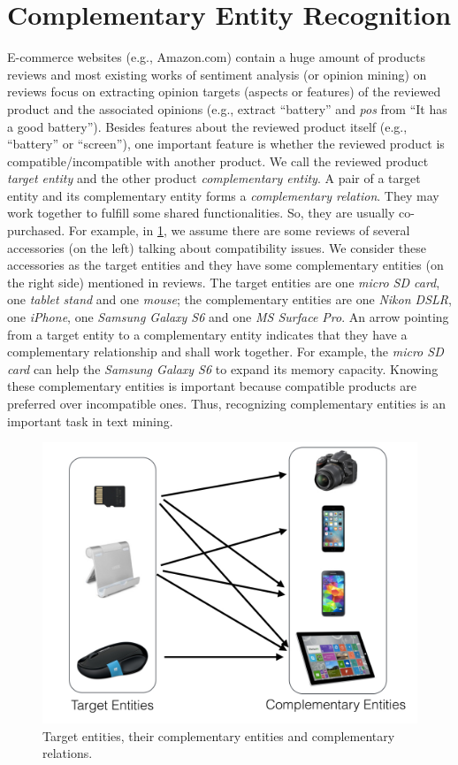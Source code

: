 
\section{Complementary Entity Recognition}

E-commerce websites (e.g., Amazon.com) contain a huge amount of products reviews and most existing works of sentiment analysis \cite{pang2002thumbs} (or opinion mining) on reviews focus on extracting opinion targets (aspects or features) of the reviewed product and the associated opinions \cite{hu2004mining,popescu2007extracting,liu2015sentiment} (e.g., extract ``battery'' and \textit{pos} from ``It has a good battery''). Besides features about the reviewed product itself (e.g., ``battery'' or ``screen''), one important feature is whether the reviewed product is compatible/incompatible with another product. We call the reviewed product \emph{target entity} and the other product \emph{complementary entity}. A pair of a target entity and its complementary entity forms a \emph{complementary relation}. They may work together to fulfill some shared functionalities. So, they are usually co-purchased. For example, in \ref{fig:sc}, we assume there are some reviews of several accessories (on the left) talking about compatibility issues. We consider these accessories as the target entities and they have some complementary entities (on the right side) mentioned in reviews. The target entities are one \textit{micro SD card}, one \textit{tablet stand} and one \textit{mouse}; the complementary entities are one \textit{Nikon DSLR}, one \textit{iPhone}, one \textit{Samsung Galaxy S6} and one \textit{MS Surface Pro}. An arrow pointing from a target entity to a complementary entity indicates that they have a complementary relationship and shall work together. For example, the \textit{micro SD card} can help the \textit{Samsung Galaxy S6} to expand its memory capacity. Knowing these complementary entities is important because compatible products are preferred over incompatible ones. Thus, recognizing complementary entities is an important task in text mining.

\begin{figure} %
   \centering
   \includegraphics[width=4.in]{fig/bd16_sub_comp.jpg}
   \caption{Target entities, their complementary entities and complementary relations.}
   \label{fig:sc}
\end{figure}

